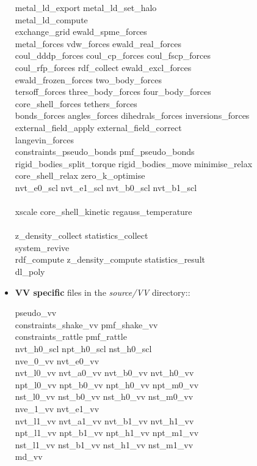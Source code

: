 \begin{itemize}
{metal\_ld\_export metal\_ld\_set\_halo \\
metal\_ld\_compute \\
exchange\_grid ewald\_spme\_forces \\
metal\_forces vdw\_forces ewald\_real\_forces \\
coul\_dddp\_forces coul\_cp\_forces coul\_fscp\_forces \\
coul\_rfp\_forces rdf\_collect ewald\_excl\_forces \\
ewald\_frozen\_forces two\_body\_forces \\
tersoff\_forces three\_body\_forces four\_body\_forces \\
core\_shell\_forces tethers\_forces \\
bonds\_forces angles\_forces dihedrals\_forces inversions\_forces \\
external\_field\_apply external\_field\_correct \\
langevin\_forces \\
constraints\_pseudo\_bonds pmf\_pseudo\_bonds \\
rigid\_bodies\_split\_torque rigid\_bodies\_move minimise\_relax \\
core\_shell\_relax zero\_k\_optimise \\
nvt\_e0\_scl nvt\_e1\_scl nvt\_b0\_scl nvt\_b1\_scl \\
\\
xscale core\_shell\_kinetic regauss\_temperature \\
\\
z\_density\_collect statistics\_collect \\
system\_revive \\
rdf\_compute z\_density\_compute statistics\_result \\
dl\_poly}

\item {\bf VV specific} files in the {\em source/VV} directory::

{\sc
pseudo\_vv \\
constraints\_shake\_vv pmf\_shake\_vv \\
constraints\_rattle pmf\_rattle \\
nvt\_h0\_scl npt\_h0\_scl nst\_h0\_scl \\
nve\_0\_vv  nvt\_e0\_vv \\
nvt\_l0\_vv nvt\_a0\_vv nvt\_b0\_vv nvt\_h0\_vv \\
npt\_l0\_vv npt\_b0\_vv npt\_h0\_vv npt\_m0\_vv \\
nst\_l0\_vv nst\_b0\_vv nst\_h0\_vv nst\_m0\_vv \\
nve\_1\_vv  nvt\_e1\_vv \\
nvt\_l1\_vv nvt\_a1\_vv nvt\_b1\_vv nvt\_h1\_vv \\
npt\_l1\_vv npt\_b1\_vv npt\_h1\_vv npt\_m1\_vv \\
nst\_l1\_vv nst\_b1\_vv nst\_h1\_vv nst\_m1\_vv \\
md\_vv}


\end{itemize}
